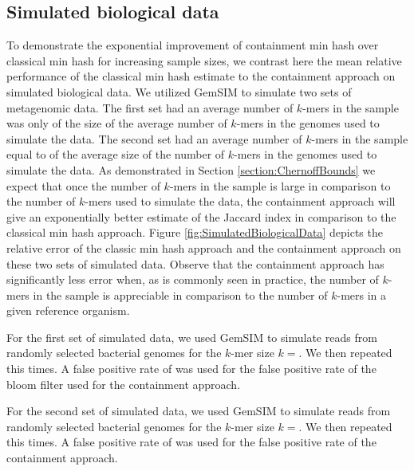 \documentclass[11pt]{amsart}
\theoremstyle{remark}
\numberwithin{equation}{section}
\newcommand{\themethod}{containment min hash }
\begin{document}
\subsection{Simulated biological data}
To demonstrate the exponential improvement of \themethod over classical min hash for increasing sample sizes, we contrast here the mean relative performance of the classical min hash estimate to the containment approach on simulated biological data. We utilized GemSIM \cite{mcelroy2012gemsim} to simulate two sets of metagenomic data. The first set had an average number of $k$-mers in the sample was only of the size of the average number of $k$-mers in the genomes used to simulate the data. The second set had an average number of $k$-mers in the sample equal to of the average size of the number of $k$-mers in the genomes used to simulate the data. As demonstrated in Section \ref{section:ChernoffBounds} we expect that once the number of $k$-mers in the sample is large in comparison to the number of $k$-mers used to simulate the data, the containment approach will give an exponentially better estimate of the Jaccard index in comparison to the classical min hash approach. Figure \ref{fig:SimulatedBiologicalData} depicts the relative error of the classic min hash approach and the containment approach on these two sets of simulated data. Observe that the containment approach has significantly less error when, as is commonly seen in practice, the number of $k$-mers in the sample is appreciable in comparison to the number of $k$-mers in a given reference organism.

For the first set of simulated data, we used GemSIM to simulate reads from randomly selected bacterial genomes for the $k$-mer size $k=$. We then repeated this times. A false positive rate of was used for the false positive rate of the bloom filter used for the containment approach.

For the second set of simulated data, we used GemSIM to simulate reads from randomly selected bacterial genomes for the $k$-mer size $k=$. We then repeated this times. A false positive rate of was used for the false positive rate of the containment approach.
\end{document}

